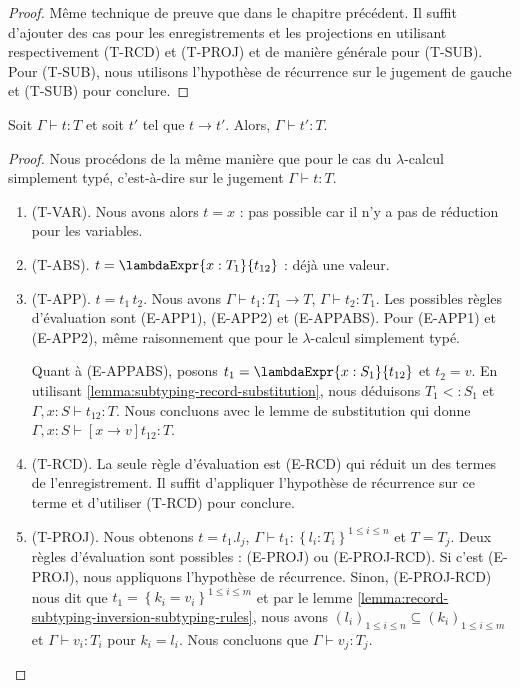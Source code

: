 \begin{proof}
  Même technique de preuve que dans le chapitre précédent. Il suffit d'ajouter 
  des cas pour les enregistrements et les projections en utilisant
  respectivement (T-RCD) et (T-PROJ) et de manière générale pour (T-SUB). Pour
  (T-SUB), nous utilisons l'hypothèse de récurrence sur le jugement de gauche et
(T-SUB) pour conclure.
\end{proof}

\begin{theorem} 
  Soit $\Gamma \vdash t : T$ et soit $t'$ tel que $t \rightarrow t'$. Alors,
  $\Gamma \vdash t' : T$.
\end{theorem}

\begin{proof}
  Nous procédons de la même manière que pour le cas du $\lambda$-calcul
  simplement typé, c'est-à-dire sur le jugement $\Gamma \vdash t : T$.
  \begin{enumerate}
    \item (T-VAR). Nous avons alors $t = x$ : pas possible car il n'y a pas de
      réduction pour les variables.
      \item (T-ABS). $t = \lambdaExpr{x : T_{1}}{t_{12}}$ : déjà une valeur.
      \item (T-APP). $t = t_{1} \, t_{2}$. Nous avons
          $\Gamma \vdash t_{1} : T_{1} \rightarrow T$, $\Gamma \vdash t_{2}
          : T_{1}$.
          Les possibles règles d'évaluation
          sont (E-APP1), (E-APP2) et (E-APPABS). Pour (E-APP1) et (E-APP2), même
          raisonnement que pour le $\lambda$-calcul simplement typé.

          Quant à (E-APPABS), posons $t_{1} = \lambdaExpr{x : S_{1}}{t_{12}}$
          et $t_{2} = v$. En utilisant
          \ref{lemma:subtyping-record-substitution}, nous déduisons $T_{1} <:
          S_{1}$ et $\Gamma, x : S \vdash t_{12} : T$. Nous concluons avec le lemme de
          substitution qui donne $\Gamma, x : S \vdash [x \rightarrow v]t_{12} :
          T$.

       \item (T-RCD). La seule règle d'évaluation est (E-RCD) qui réduit un des
         termes de l'enregistrement. Il suffit d'appliquer l'hypothèse de
         récurrence sur ce terme et d'utiliser (T-RCD) pour conclure.

       \item (T-PROJ). Nous obtenons $t = t_{1}.l_{j}$, $\Gamma \vdash t_{1}
         : \left\{ l_{i} : T_{i} \right\}^{1 \leq i \leq n}$ et $T = T_{j}$.
         Deux règles d'évaluation sont possibles : (E-PROJ) ou (E-PROJ-RCD). Si
         c'est (E-PROJ), nous appliquons l'hypothèse de récurrence. Sinon,
         (E-PROJ-RCD) nous dit que $t_{1} = \left\{ k_{i} = v_{i} \right\}^{1
           \leq i \leq m}$ et par le lemme
         \ref{lemma:record-subtyping-inversion-subtyping-rules}, nous avons
         $(l_{i})_{1 \leq i \leq n} \subseteq (k_{i})_{1 \leq i \leq m}$ et
         $\Gamma \vdash v_{i} : T_{i}$ pour $k_{i} = l_{i}$. Nous concluons
         que $\Gamma \vdash v_{j} : T_{j}$.


\end{enumerate}
\end{proof}
